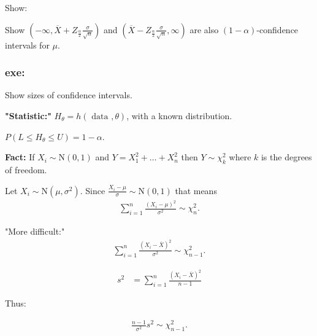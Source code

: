 \documentclass[10pt]{article}
\begin{document}
Show:

\begin{exercise}[]  \label{exe:}
Show
\(( - \infty , \overline{X} + Z  _{\frac{\alpha}{2}} \frac{\sigma}{\sqrt{n}})\) and
\((\overline{X} -  Z _{\frac{\alpha}{2}} \frac{\sigma}{\sqrt{n}}, \infty)\) are also \((1 - \alpha )\)-confidence intervals for \(\mu\).
\end{exercise}

\subsubsection{exe:}
\label{sec:org2b5fc0d}
\begin{exercise}[]  \label{exe:}
Show sizes of confidence intervals.
\end{exercise}



\textbf{"Statistic:"}
\(H _{\theta }  = h(\text{ data }, \theta )\), with a known distribution.

\(P( L \leq H _{\theta } \leq U) = 1 - \alpha\).

\textbf{Fact:}
If \(X_i \sim \text{N}(0 , 1)\) and \(Y =  X_1 ^2 + \dots + X_n^2\) then
\(Y \sim \chi  _{k} ^2\) where \(k\) is the degrees of freedom.

Let \(X_i \sim \text{N}(\mu , \sigma^2)\). Since \(\frac{X_i -  \mu }{\sigma } \sim \text{N}(0 , 1)\) that means
\begin{align*}
\sum_{ i = 1 }^{ n } \frac{\left( X_i - \mu  \right) ^2 }{\sigma ^2 } \sim \chi ^2  _{n} .
\end{align*}

"More difficult:"
\begin{align*}
\sum_{ i = 1 }^{ n } \frac{(X_i -  \overline{X}) ^2 }{\sigma ^2 } \sim \chi  _{n - 1} ^2 .
\end{align*}


\begin{definition}  \label{def:Sample_Variance}
\begin{align*}
s ^2  &  = \sum_{ i = 1 }^{ n } \frac{(X_i - \overline{X})^2 }{n - 1}
\end{align*}
\end{definition}

Thus:

\begin{theorem}[] \label{thm:}
\begin{align*}
\frac{n - 1}{\sigma ^2 } s^2  \sim \chi  _{n - 1} ^2 .
\end{align*}
\end{theorem}
\end{document}
